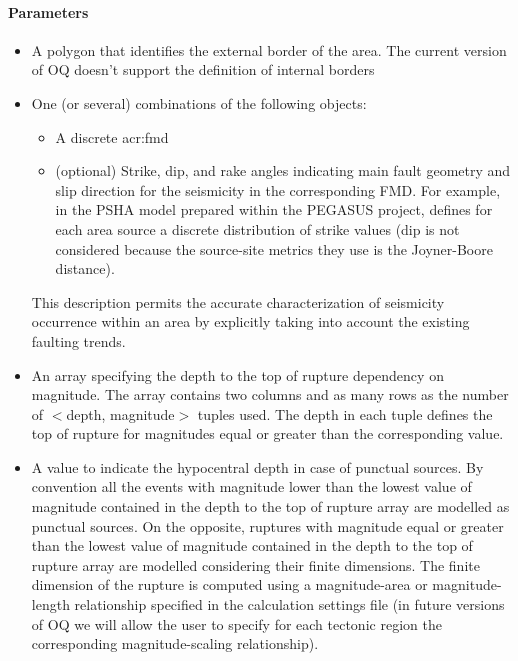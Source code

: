 \paragraph{Parameters}
\begin{itemize}
\item A polygon that identifies the external border of the area. 
The current version of OQ doesn't support the definition 
of internal borders
\item One (or several) combinations of the following objects:
\begin{itemize}
	\item A discrete \gls{acr:fmd}
	\item (optional) Strike, dip, and rake angles indicating 
	main fault geometry and slip direction for the seismicity  
	in the corresponding FMD.
	For example, in the PSHA model prepared within the PEGASUS project,
	\cite{coppersmith2009} defines for each area source a discrete 
	distribution of strike values (dip is not considered because the 
	source-site metrics they use is the Joyner-Boore distance). 
\end{itemize}
%
This description permits the accurate characterization of seismicity 
occurrence within an area by explicitly taking into account the existing 
faulting trends. 
%
\item An array specifying the depth to the top of rupture dependency on 
magnitude. The array contains two columns and as many rows as the 
number of $<$depth, magnitude$>$ tuples used. 
The depth in each tuple defines the top of rupture for magnitudes equal 
or greater than the corresponding value. 
%
\item A value to indicate the hypocentral depth in case of punctual sources. 
By convention all the events with magnitude lower than the lowest value of 
magnitude contained in the depth to the top of rupture array are modelled as 
punctual sources. 
%
On the opposite, ruptures with magnitude equal or greater than 
the lowest value of magnitude contained in the depth to the top of rupture array 
are modelled considering their finite dimensions. The finite dimension of the 
rupture is computed using a magnitude-area or magnitude-length relationship 
specified in the calculation settings file (in future versions of OQ we will 
allow the user to specify for each tectonic region the corresponding 
magnitude-scaling relationship).
\end{itemize}
%
